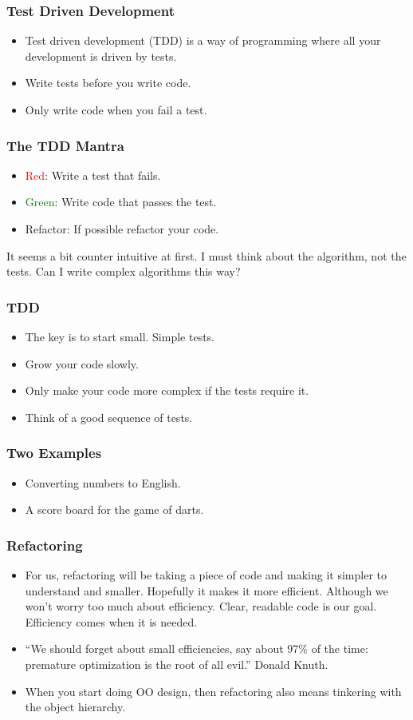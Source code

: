 \documentclass{beamer}
\begin{document}
\begin{frame}
\frametitle{Test Driven Development}
\begin{itemize}
\item Test driven development (TDD) is a way of programming where all
  your development is driven by tests.
\item Write tests before you write code. 
\item Only write code when you fail a test. 
\end{itemize}
  \end{frame}
\begin{frame}
\frametitle{The TDD Mantra}
\begin{itemize}
\item \textcolor{red}{Red}: Write a test that fails.
\item \textcolor{green}{Green}: Write code that passes the test.
\item Refactor: If possible refactor your code.
\end{itemize}
It seems a bit counter intuitive at first. I must think about the
algorithm, not the tests. Can I write complex algorithms this way?  
\end{frame}
\begin{frame}
  \frametitle{TDD}
  \begin{itemize}
  \item The key is to start small. Simple tests.
  \item Grow your code slowly. 
  \item Only make your code more complex if the tests require it.
  \item Think of a good sequence of tests.
  \end{itemize}
\end{frame}
\begin{frame}
  \frametitle{Two Examples}
  \begin{itemize}
  \item Converting numbers to English.
  \item A score board for the game of darts.
  \end{itemize}
\end{frame}
\begin{frame}
  \frametitle{Refactoring}
  \begin{itemize}
  \item For us, refactoring will be taking a piece of code and making
    it simpler to understand and smaller. Hopefully it makes it more
    efficient. Although we won't worry too much about
    efficiency. Clear, readable code is our goal. Efficiency comes when
    it is needed.
  \item ``We should forget about small efficiencies, say about 97\% of
    the time: premature optimization is the root of all evil.'' Donald Knuth.
  \item When you start doing OO design, then refactoring  also means
    tinkering with the object hierarchy.
  \end{itemize}
\end{frame}
\end{document}
